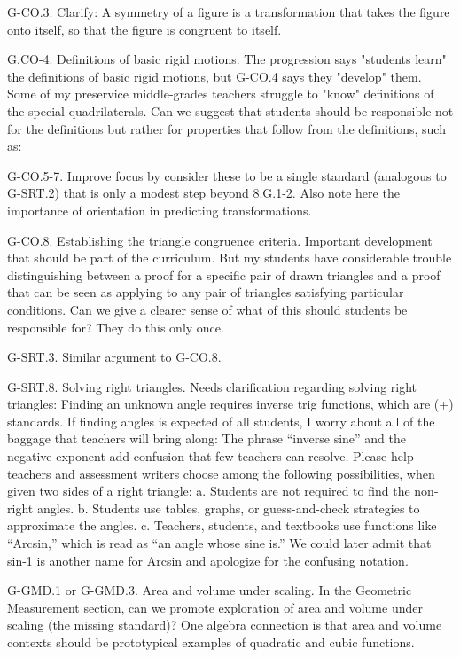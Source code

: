 G-CO.3.  Clarify:  A symmetry of a figure is a transformation that takes the figure onto itself, so that the figure is congruent to itself. 

G.CO-4.  Definitions of basic rigid motions.  The progression says "students learn" the definitions of basic rigid motions, but G-CO.4 says they "develop" them.  Some of my preservice middle-grades teachers struggle to "know" definitions of the special quadrilaterals.  Can we suggest that students should be responsible not for the definitions but rather for properties that follow from the definitions, such as:  

G-CO.5-7.  Improve focus by consider these to be a single standard (analogous to G-SRT.2) that is only a modest step beyond 8.G.1-2.  Also note here the importance of orientation in predicting transformations.  

G-CO.8.  Establishing the triangle congruence criteria.  Important development that should be part of the curriculum.  But my students have considerable trouble distinguishing between a proof for a specific pair of drawn triangles and a proof that can be seen as applying to any pair of triangles satisfying particular conditions.  Can we give a clearer sense of what of this should students be responsible for?  They do this only once.  

G-SRT.3.  Similar argument to G-CO.8.  

G-SRT.8.  Solving right triangles.  Needs clarification regarding solving right triangles: Finding an unknown angle requires inverse trig functions, which are (+) standards.  If finding angles is expected of all students, I worry about all of the baggage that teachers will bring along:  The phrase “inverse sine” and the negative exponent add confusion that few teachers can resolve.  Please help teachers and assessment writers choose among the following possibilities, when given two sides of a right triangle:  
a. Students are not required to find the non-right angles. 
b. Students use tables, graphs, or guess-and-check strategies to approximate the angles. 
c. Teachers, students, and textbooks use functions like “Arcsin,” which is read as “an angle whose sine is.”  We could later admit that sin-1 is another name for Arcsin and apologize for the confusing notation.  

G-GMD.1 or G-GMD.3.  Area and volume under scaling.  In the Geometric Measurement section, can we promote exploration of area and volume under scaling (the missing standard)?  One algebra connection is that area and volume contexts should be prototypical examples of quadratic and cubic functions.  


